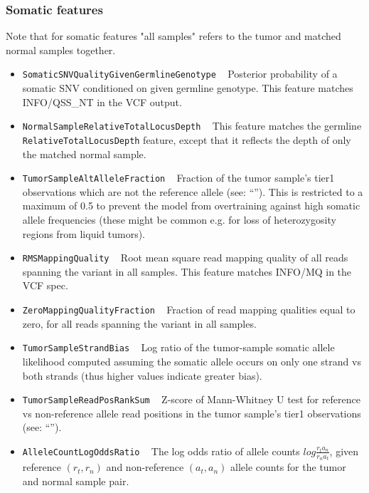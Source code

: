 \documentclass{article}
\begin{document}
\subsubsection{Somatic features}

Note that for somatic features "all samples" refers to the tumor and matched normal samples together.

\begin{itemize}

    \item \texttt{SomaticSNVQualityGivenGermlineGenotype} ~ Posterior probability of a somatic SNV conditioned on given germline genotype. This feature matches INFO/QSS\_NT in the VCF output.

    \item \texttt{NormalSampleRelativeTotalLocusDepth} ~ This feature matches the germline \texttt{RelativeTotalLocusDepth} feature, except that it reflects the depth of only the matched normal sample.

    \item \texttt{TumorSampleAltAlleleFraction} ~ Fraction of the tumor sample's tier1 observations which are not the reference allele (see: ``''). This is restricted to a maximum of 0.5 to prevent the model from overtraining against high somatic allele frequencies (these might be common e.g. for loss of heterozygosity regions from liquid tumors).

    \item \texttt{RMSMappingQuality} ~ Root mean square read mapping quality of all reads spanning the variant in all samples. This feature matches INFO/MQ in the VCF spec.

    \item \texttt{ZeroMappingQualityFraction} ~ Fraction of read mapping qualities equal to zero, for all reads spanning the variant in all samples.

    \item \texttt{TumorSampleStrandBias} ~ Log ratio of the tumor-sample somatic allele likelihood computed assuming the somatic allele occurs on only one strand vs both strands
    (thus higher values indicate greater bias).

    \item \texttt{TumorSampleReadPosRankSum} ~ Z-score of Mann-Whitney U test for reference vs non-reference allele read positions in the tumor sample's tier1 observations (see: ``'').

    \item \texttt{AlleleCountLogOddsRatio} ~ The log odds ratio of allele counts $log{\frac{r_t a_n} {r_n a_t}}$, given reference $(r_t,r_n)$ and non-reference $(a_t,a_n)$ allele counts for the tumor and normal sample pair.


\end{itemize}
\end{document}
